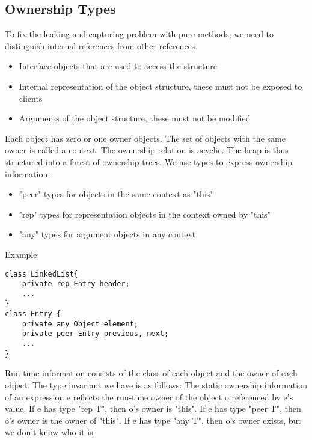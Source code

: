 \subsection{Ownership Types}
\begin{mytitle} To fix the leaking and capturing problem with pure methods, we need to distinguish internal references from other references.
\end{mytitle}
\begin{mytitle}\hfill
\begin{itemize}
    \item Interface objects that are used to access the structure
    \item Internal representation of the object structure, these must not be exposed to clients
    \item Arguments of the object structure, these must not be modified
\end{itemize}
\end{mytitle}
\begin{mytitle} Each object has zero or one owner objects. The set of objects with the same owner is called a context. The ownership relation is acyclic. The heap is thus structured into a forest of ownership trees. We use types to express ownership information:
\begin{itemize}
    \item "peer" types for objects in the same context as "this"
    \item "rep" types for representation objects in the context owned by "this"
    \item "any" types for argument objects in any context
\end{itemize}
Example:
\lstset{language=Java}
\begin{lstlisting}
class LinkedList{
    private rep Entry header;
    ...
}
class Entry {
    private any Object element;
    private peer Entry previous, next;
    ...
}
\end{lstlisting}
\end{mytitle}
\begin{mytitle} Run-time information consists of the class of each object and the owner of each object. The type invariant we have is as follows: The static ownership information of an expression e reflects the run-time owner of the object o referenced by e's value. If e has type "rep T", then o's owner is "this". If e has type "peer T", then o's owner is the owner of "this". If e has type "any T", then o's owner exists, but we don't know who it is. 
\end{mytitle}
